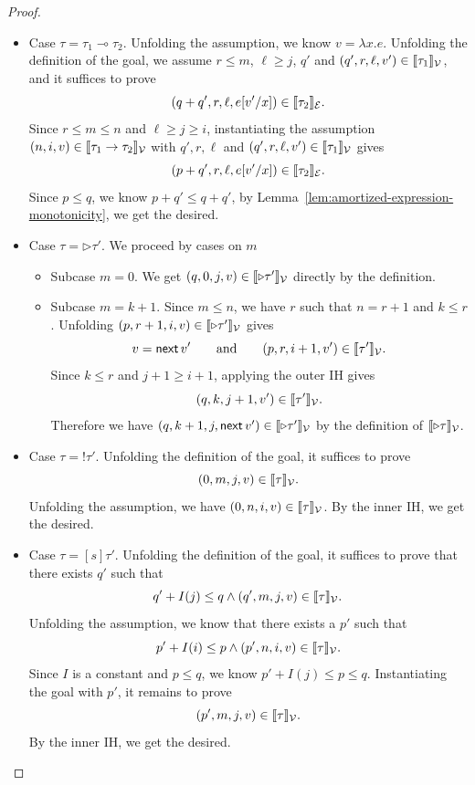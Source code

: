 \begin{proof}
\begin{itemize}
\begin{itemize}
\item {Subcase $v = \mathsf{inr}\,v_2$.}
The proof is symmetric to the first subcase.
\end{itemize}

\item Case $\tau = \tau_1\multimap\tau_2$.
Unfolding the assumption, we know $v = \lambda x.e$. Unfolding the definition of the goal, we assume 
$r \leq m$, $\ell \geq j$, $q'$ and $(q',r, \ell, v') \in \llbracket \tau_1 \rrbracket_{\mathcal{V}}$, and
it suffices to prove 
\[(q+q',r, \ell, e[v'/x]) \in \llbracket \tau_2 \rrbracket_{\mathcal{E}}.\]
Since $r\leq m\leq n$ and $\ell\geq j\geq i$, instantiating the assumption $(n, i, v) \in \llbracket \tau_1 \to \tau_2 \rrbracket_{\mathcal{V}}$ with
$q', r, \ell$ and $(q',r, \ell, v') \in \llbracket \tau_1 \rrbracket_{\mathcal{V}}$ gives
\[(p+q',r, \ell, e[v'/x]) \in \llbracket \tau_2 \rrbracket_{\mathcal{E}}.\]
Since $p \leq q$, we know $p+q'\leq q+q'$, by Lemma~\ref{lem:amortized-expression-monotonicity}, we get the desired.

\item Case $\tau=\triangleright\tau'$.
We proceed by cases on $m$

\begin{itemize}
\item {Subcase $m=0$.}
We get $(q, 0,j,v) \in \llbracket \triangleright\tau' \rrbracket_{\mathcal{V}}$ directly by the definition.

\item {Subcase $m=k+1$.}
Since $m \leq n$, we have $r$ such that
$n = r+1$ and $k \leq r$. Unfolding $(p, r+1, i, v) \in \llbracket \triangleright \tau' \rrbracket_{\mathcal{V}}$ gives
\[v = \mathsf{next}\, v' \qquad\text{and} \qquad (p,r,i+1,v')\in\llbracket \tau' \rrbracket_{\mathcal{V}}.\]
Since $k \leq r$ and $j+1\geq i+1$, applying the outer IH gives
\[(q, k,j+1,v')\in\llbracket \tau' \rrbracket_{\mathcal{V}}.\]
Therefore we have $(q, k+1,j,\mathsf{next}\, v') \in \llbracket \triangleright\tau' \rrbracket_{\mathcal{V}}$ by the definition of $\llbracket \triangleright \tau \rrbracket_{\mathcal{V}}$.
\end{itemize}

\item Case $\tau=!\tau'$. Unfolding the definition of the goal, it suffices to prove
\[(0, m, j,v) \in \llbracket \tau \rrbracket_{\mathcal{V}}.\]
Unfolding the assumption, we have $(0, n, i, v) \in \llbracket \tau \rrbracket_{\mathcal{V}}$.
By the inner IH, we get the desired.

\item Case $\tau=[s]\tau'$.
Unfolding the definition of the goal, it suffices to prove that there exists $q'$ such that
\[q'+I(j) \leq q \land (q', m, j, v) \in \llbracket \tau \rrbracket_{\mathcal{V}}.\]
Unfolding the assumption, we know that there exists a $p'$ such that 
\[p'+ I(i) \leq p \land (p', n, i, v) \in \llbracket \tau \rrbracket_{\mathcal{V}}.\]
Since $I$ is a constant and $p \leq q$, we know $p' + I(j) \leq p \leq q$.
Instantiating the goal with $p'$, it remains to prove 
\[(p', m, j, v) \in \llbracket \tau \rrbracket_{\mathcal{V}}.\]
By the inner IH, we get the desired.


\end{itemize}
\end{proof}
